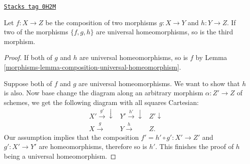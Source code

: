 \begin{lemma}
\label{morphisms-lemma-permanence-universal-homeomorphism}
\href{https://stacks.math.columbia.edu/tag/0H2M}{\texttt{Stacks tag 0H2M}}

Let $f : X \to Z$ be the composition of two morphisms
$g : X \to Y$ and $h : Y \to Z$.
If two of the morphisms $\{f, g, h\}$ are universal homeomorphisms,
so is the third morphism.
\end{lemma}

\begin{proof}

If both of $g$ and $h$ are universal homeomorphisms, so is $f$ by
Lemma \ref{morphisms-lemma-composition-universal-homeomorphism}.

\medskip\noindent
Suppose both of $f$ and $g$ are universal homeomorphisms. We want to show
that $h$ is also. Now base change the diagram along an arbitrary morphism
$\alpha : Z' \to Z$ of schemes,  we get the following diagram with all
squares Cartesian:
$$
\begin{array}{ccc}X' \overset{g'}{\longrightarrow}\downarrow & Y' \overset{h'}{\longrightarrow}\downarrow & Z' \downarrow \\ X \overset{g}{\longrightarrow} & Y \overset{h}{\longrightarrow} & Z.\end{array}
$$
Our assumption implies that the composition $f'= h' \circ g' : X' \to Z'$
and $g' : X' \to Y'$ are homeomorphisms, therefore so is $h'$.
This finishes the proof of $h$ being a universal homeomorphism.


\end{proof}
